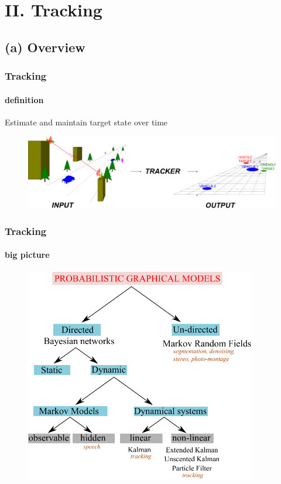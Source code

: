\section{II. Tracking}
\subsection{(a) Overview}
\begin{frame}
\frametitle{Tracking}
\framesubtitle{definition}
\logoCSIPCPL\mypagenum
	Estimate and maintain {\color{red}target state} over {\color{red}time}
	\begin{figure}
		\includegraphics[width=1.0\textwidth]{thesis/TRK_overviewDiagram.pdf}
	\end{figure}
\end{frame}



\begin{frame}
\frametitle{Tracking}
\framesubtitle{big picture}
\logoCSIPCPL\mypagenum
	\begin{figure}
		\includegraphics[width=0.9\textwidth]{thesis/PRML_PGM_overview.pdf}
	\end{figure}
\end{frame}





